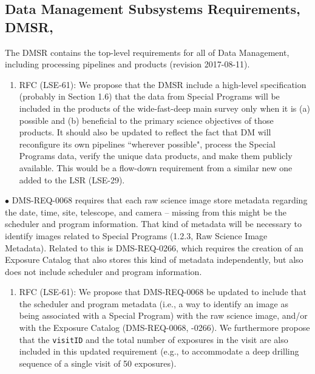 \subsection{Data Management Subsystems Requirements, DMSR, }\label{ssec:docrev_dmsr}

The DMSR contains the top-level requirements for all of Data Management, including processing pipelines and products (revision 2017-08-11).

\begin{enumerate}[resume,topsep=-10pt,after=\vspace{10pt},label= \textbf{Action \Roman*}] \item \label{DMSR-0} RFC (LSE-61): We propose that the DMSR include a high-level specification (probably in Section 1.6) that the data from Special Programs will be included in the products of the wide-fast-deep main survey only when it is (a) possible and (b) beneficial to the primary science objectives of those products. It should also be updated to reflect the fact that DM will reconfigure its own pipelines ``wherever possible", process the Special Programs data, verify the unique data products, and make them publicly available. This would be a flow-down requirement from a similar new one added to the LSR (LSE-29).  \end{enumerate}

$\bullet$ DMS-REQ-0068 requires that each raw science image store metadata regarding the date, time, site, telescope, and camera -- missing from this might be the scheduler and program information. That kind of metadata will be necessary to identify images related to Special Programs (1.2.3, Raw Science Image Metadata). Related to this is DMS-REQ-0266, which requires the creation of an Exposure Catalog that also stores this kind of metadata independently, but also does not include scheduler and program information.
\begin{enumerate}[resume,topsep=-10pt,after=\vspace{10pt},label= \textbf{Action \Roman*}] \item \label{DMSR-1} RFC (LSE-61): We propose that DMS-REQ-0068 be updated to include that the scheduler and program metadata (i.e., a way to identify an image as being associated with a Special Program) with the raw science image, and/or with the Exposure Catalog (DMS-REQ-0068, -0266). We furthermore propose that the \texttt{visitID} and the total number of exposures in the visit are also included in this updated requirement (e.g., to accommodate a deep drilling sequence of a single visit of 50 exposures). \end{enumerate}


